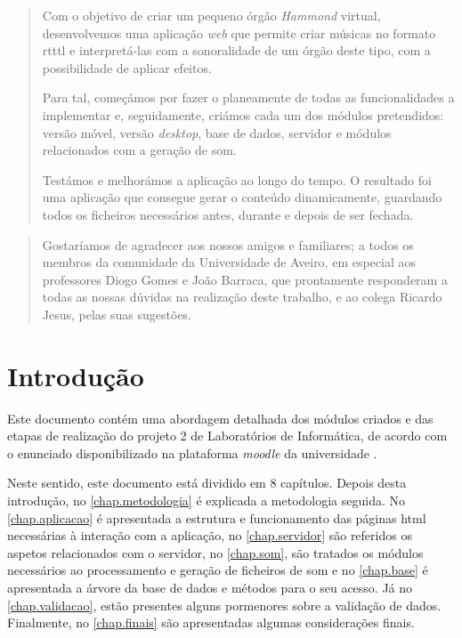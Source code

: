 \documentclass{report}
\begin{document}
\begin{abstract}

Com o objetivo de criar um pequeno órgão \emph{Hammond} virtual, desenvolvemos uma aplicação \emph{web} que permite criar músicas no formato \ac{rtttl} e interpretá-las com a sonoralidade de um órgão deste tipo, com a possibilidade de aplicar efeitos.

Para tal, começámos por fazer o planeamente de todas as funcionalidades a implementar e, seguidamente, criámos cada um dos módulos pretendidos: versão móvel, versão \emph{desktop}, base de dados, servidor e módulos relacionados com a geração de som.

Testámos e melhorámos a aplicação ao longo do tempo. O resultado foi uma aplicação que consegue gerar o conteúdo dinamicamente, guardando todos os ficheiros necessários antes, durante e depois de ser fechada.

\end{abstract}

\renewcommand{\abstractname}{Agradecimentos}
\begin{abstract}
Gostaríamos de agradecer aos nossos amigos e familiares; a todos os membros da comunidade da Universidade de Aveiro, em especial aos  professores Diogo Gomes e João Barraca, que prontamente responderam a todas as nossas dúvidas na realização deste trabalho, e ao colega Ricardo Jesus, pelas suas sugestões.
\end{abstract}


\tableofcontents
\listoffigures


\clearpage
{}

\chapter{Introdução}
\label{chap.introducao}
Este documento contém uma abordagem detalhada dos módulos criados e das etapas de realização do projeto 2 de Laboratórios de Informática, de acordo com o enunciado disponibilizado na plataforma \textit{moodle} da universidade \cite{moodle}.

Neste sentido, este documento está dividido em 8 capítulos. Depois desta introdução, no \autoref{chap.metodologia} é explicada a metodologia seguida. No \autoref{chap.aplicacao} é apresentada a estrutura e funcionamento das páginas \ac{html} necessárias à interação com a aplicação, no \autoref{chap.servidor} são referidos os aspetos relacionados com o servidor, no \autoref{chap.som}, são tratados os módulos necessários ao processamento e geração de ficheiros de som e no \autoref{chap.base} é apresentada a árvore da base de dados e métodos para o seu acesso. Já no \autoref{chap.validacao}, estão presentes alguns pormenores sobre a validação de dados. Finalmente, no \autoref{chap.finais} são apresentadas algumas considerações finais.
\end{document}
